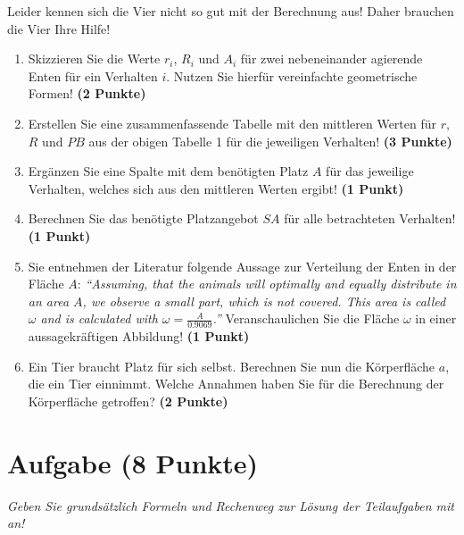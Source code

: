 \documentclass[a4paper, 9pt]{scrartcl}\usepackage[]{graphicx}\usepackage[]{xcolor}
\begin{document}
Leider kennen sich die Vier nicht so gut mit der Berechnung aus! Daher brauchen die Vier Ihre Hilfe!

\begin{enumerate}
\item Skizzieren Sie die Werte $r_i$, $R_i$ und $A_i$ für zwei nebeneinander agierende Enten für ein Verhalten $i$. Nutzen Sie hierfür vereinfachte geometrische Formen! \textbf{(2 Punkte)}
\item Erstellen Sie eine zusammenfassende Tabelle mit den mittleren Werten für $r$, $R$ und $PB$ aus der obigen Tabelle 1 für die jeweiligen Verhalten! \textbf{(3 Punkte)}
\item Ergänzen Sie eine Spalte mit dem benötigten Platz $A$ für das jeweilige Verhalten, welches sich aus den mittleren Werten ergibt! \textbf{(1 Punkt)}
\item Berechnen Sie das benötigte Platzangebot $SA$ für alle betrachteten Verhalten! \textbf{(1 Punkt)}
\item Sie entnehmen der Literatur folgende Aussage zur Verteilung der Enten in der Fläche $A$: \textit{"`Assuming, that the animals will optimally and equally distribute in an area $A$, we observe a
    small part, which is not covered. This area is called $\omega$ and is calculated with $\omega = \tfrac{A}{0.9069}$."'} Veranschaulichen Sie die Fläche $\omega$ in einer aussagekräftigen Abbildung!  \textbf{(1 Punkt)}
\item Ein Tier braucht Platz für sich selbst. Berechnen Sie nun die Körperfläche $a$, die ein Tier einnimmt. Welche Annahmen haben Sie für die Berechnung der Körperfläche getroffen? \textbf{(2 Punkte)}
\end{enumerate}



 
\clearpage

\section{Aufgabe \hfill (8 Punkte)}

\textit{Geben Sie grundsätzlich Formeln und Rechenweg zur Lösung der Teilaufgaben mit an!} \\[1Ex]
 
\end{document}
